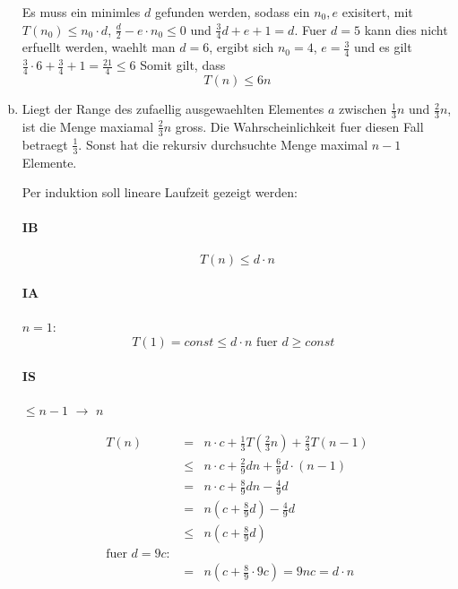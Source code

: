\begin{enumerate}[(a)]
    Es muss ein minimles $d$ gefunden werden, sodass ein $n_0, e$ exisitert, mit $T(n_0) \leq n_0 \cdot d$,
    $\frac{d}{2}- e \cdot n_0 \leq 0$ und $\frac{3}{4}d+e+1 = d$.
    Fuer $d=5$ kann dies nicht erfuellt werden,
    waehlt man $d=6$, ergibt sich $n_0=4$, $e=\frac{3}{4}$ und es gilt $\frac{3}{4} \cdot 6 + \frac{3}{4} + 1 = \frac{21}{4} \leq 6$
    Somit gilt, dass
    \begin{equation}
    T(n) \leq 6 n
    \end{equation}

\item
    Liegt der Range des zufaellig ausgewaehlten Elementes $a$ zwischen $\frac{1}{3}n$ und $\frac{2}{3}n$,
    ist die Menge maxiamal $\frac{2}{3} n$ gross. Die Wahrscheinlichkeit fuer diesen Fall betraegt $\frac{1}{3}$.
    Sonst hat die rekursiv durchsuchte Menge maximal $n-1$ Elemente.

    Per induktion soll lineare Laufzeit gezeigt werden: 
    
    \paragraph{IB}
    \begin{equation}
    T(n) \leq d \cdot n
    \end{equation}

    \paragraph{IA} $n=1$:
    \begin{equation}
    T(1) = const\leq d \cdot n \text{ fuer $d \geq const$ }
    \end{equation}

    \paragraph{IS} $\leq n-1$ $\to$ $n$

    \begin{eqnarray}
    T(n) &=& n \cdot c + \frac{1}{3} T(\frac{2}{3} n) + \frac{2}{3} T(n-1) \\
         &\leq& n \cdot c + \frac{2}{9} d n + \frac{6}{9} d \cdot (n-1) \\
         &=& n \cdot c + \frac{8}{9} dn - \frac{4}{9} d \\
         &=& n (c + \frac{8}{9} d) - \frac{4}{9} d \\
         &\leq& n (c + \frac{8}{9} d) \\
         \text{fuer $d=9c$: }\\
         &=& n (c + \frac{8}{9} \cdot 9c) = 9 n c = d \cdot n
    \end{eqnarray}
\end{enumerate}

